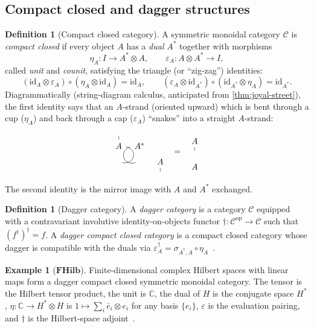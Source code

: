 \documentclass[12pt]{article}
\theoremstyle{definition}
\newtheorem{definition}[theorem]{Definition}
\newtheorem{example}[theorem]{Example}
\theoremstyle{remark}
\newcommand{\C}{\mathcal{C}}
\newcommand{\FHilb}{\mathbf{FHilb}}
\newcommand{\op}{\mathrm{op}}
\newcommand{\id}{\mathrm{id}}
\begin{document}
\subsection{Compact closed and dagger structures}

\begin{definition}[Compact closed category]
\label{def:compact-closed}
A symmetric monoidal category $\C$ is \emph{compact closed} if every object $A$ has a \emph{dual} $A^*$ together with morphisms
\[
\eta_A : I \to A^* \otimes A,
\qquad
\varepsilon_A : A \otimes A^* \to I,
\]
called \emph{unit} and \emph{counit}, satisfying the triangle (or ``zig-zag'') identities:
\[
(\id_A \otimes \varepsilon_A) \circ (\eta_A \otimes \id_A) = \id_A,
\qquad
(\varepsilon_A \otimes \id_{A^*}) \circ (\id_{A^*} \otimes \eta_A) = \id_{A^*}.
\]
Diagrammatically (string-diagram calculus, anticipated from \cref{thm:joyal-street}), the first identity says that an $A$-strand (oriented upward) which is bent through a cup ($\eta_A$) and back through a cap ($\varepsilon_A$) ``snakes'' into a straight $A$-strand:
\[
\begin{tikzcd}[column sep=tiny, row sep=tiny]
{}\arrow[d, no head] & {} & {}\\
A \arrow[d, bend left=90, looseness=2, no head] & A^* \arrow[d, bend right=90, looseness=2, no head] & {}\\
{} & {} & A \arrow[d, no head]\\
{} & {} & {}
\end{tikzcd}
\;\;=\;\;
\begin{tikzcd}[column sep=tiny, row sep=tiny]
A \arrow[d, no head]\\
{}\\
A
\end{tikzcd}
\]
The second identity is the mirror image with $A$ and $A^*$ exchanged.
\end{definition}

\begin{definition}[Dagger category]
A \emph{dagger category} is a category $\C$ equipped with a contravariant involutive identity-on-objects functor $\dagger : \C^\op \to \C$ such that $(f^\dagger)^\dagger = f$. A \emph{dagger compact closed category} is a compact closed category whose dagger is compatible with the duals via $\varepsilon_A^\dagger = \sigma_{A^*,A} \circ \eta_A$~\cite{abramskycoecke2004}.
\end{definition}

\begin{example}[$\FHilb$]
\label{ex:fhilb}
Finite-dimensional complex Hilbert spaces with linear maps form a dagger compact closed symmetric monoidal category. The tensor is the Hilbert tensor product, the unit is $\mathbb{C}$, the dual of $H$ is the conjugate space $H^*$, $\eta : \mathbb{C} \to H^* \otimes H$ is $1 \mapsto \sum_i \bar{e}_i \otimes e_i$ for any basis $\{e_i\}$, $\varepsilon$ is the evaluation pairing, and $\dagger$ is the Hilbert-space adjoint~\cite{abramskycoecke2004}.
\end{example}
\end{document}
